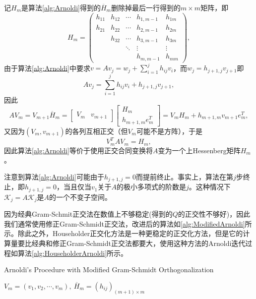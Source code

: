 \documentclass[a4paper,10pt]{ctexart}
\begin{document}
记$ H_m $是算法\ref{alg:Arnoldi}得到的$ \overline{H}_m $删除掉最后一行得到的$ m\times m $矩阵，即
\[
    H_m = \begin{pmatrix}
        h_{11} & h_{12} & \cdots & h_{1,m-1} & h_{1m}\\
        h_{21} & h_{22} & \cdots & h_{2,m-1} & h_{2m}\\
         & h_{32} & \cdots & h_{3,m-1} & h_{3m}\\
         &  & \ddots & \vdots & \vdots\\
         &  &  & h_{m, m-1} & h_{mm}
    \end{pmatrix},
\]
由于算法\ref{alg:Arnoldi}中要求$ v = Av_j = w_j + \sum_{i=1}^j h_{ij}v_i $，而$ w_j = h_{j+1,j}v_{j+1} $即
\[
    Av_j = \sum_{i=1}^j h_{ij}v_i + h_{j+1,j}v_{j+1},
\]
因此
\begin{equation}
    AV_m = V_{m+1} \overline{H}_m = 
    \begin{bmatrix} 
        V_m  & v_{m+1}
    \end{bmatrix} 
    \begin{bmatrix} 
        H_m\\
        h_{m+1,m}e_m^T
    \end{bmatrix} = V_m H_m + h_{m+1,m}v_{m+1}e_m^T,
\end{equation}
又因为$ (V_m,v_{m+1}) $的各列互相正交（但$ V_m $可能不是方阵），于是
\begin{equation}
    V^T_m AV_m = H_m,
\end{equation}
因此算法\ref{alg:Arnoldi}等价于使用正交合同变换将$ A $变为一个上Hessenberg矩阵$ H_m $。

注意到算法\ref{alg:Arnoldi}可能由于$ h_{j+1,j} = 0 $而提前终止。事实上，算法在第$ j $步终止，即$ h_{j+1,j} = 0 $，当且仅当$ v_1 $关于$ A $的极小多项式的阶数是$ j $。这种情况下$ \mathcal{K}_j = A \mathcal{K}_j $是$ A $的一个不变子空间。

因为经典Gram-Schmit正交法在数值上不够稳定(得到的$ Q $的正交性不够好)，因此我们通常使用修正Gram-Schmidt正交法，改进后的算法如\ref{alg:ModifiedArnoldi}所示。除此之外，Householder正交化方法是一种更稳定的正交化方法，但是它的计算量要比经典和修正Gram-Schmidt正交法都要大，使用这种方法的Arnoldi迭代过程如算法\ref{alg:HouseholderArnoldi}所示。
\begin{algorithm}[htbp]
    \caption{Arnoldi's Procedure with Modified Gram-Schmidt Orthogonalization}\label{alg:ModifiedArnoldi}
    \Return $ V_m = (v_1, v_2, \cdots , v_m),\ \overline{H}_m = (h_{ij})_{(m+1)\times m} $\;
\end{algorithm}
\end{document}
